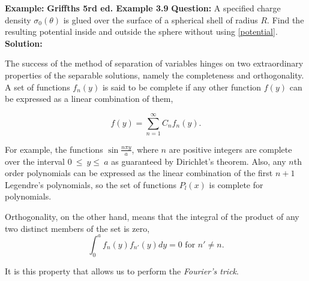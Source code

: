 \documentclass[a4paper,12pt]{report}
\begin{document}
	\begin{example_template}
		\textbf{Example:} \textbf{Griffths 5rd ed. Example 3.9} \newline \newline
		\textbf{Question:} A specified charge density \(\sigma_0(\theta)\) is glued over the surface of a spherical shell of radius \(R\). Find the resulting potential inside and outside the sphere without using \cref{potential}.  \newline \newline
		\textbf{Solution:}  
	\end{example_template}
	
	The success of the method of separation of variables hinges on two extraordinary properties of the separable solutions, namely the completeness and orthogonality. A set of functions \(f_{n} (y)\) is said to be complete if any other function \(f(y)\) can be expressed as a linear combination of them, \ie 
	
	\begin{equation}
		f(y) = \sum_{n=1}^{\infty} C_{n} f_{n} (y). 
	\end{equation}
	
	For example, the functions \(\sin \frac{n\pi y}{a}\), where \(n\) are positive integers are complete over the interval \(0~\le~y\le~a\) as guaranteed by Dirichlet's theorem. Also, any \(n\)th order polynomials can be expressed as the linear combination of the first \(n+1\) Legendre's polynomials, so the set of functions \(P_{l} (x)\) is complete for polynomials.
	
	Orthogonality, on the other hand, means that the integral of the product of any two distinct members of the set is zero, \ie 
	\begin{equation}
		\int_{0}^{a} f_{n} (y) f_{n'} (y) dy = 0 \text { for }  n' \neq n. 
	\end{equation}
	
	It is this property that allows us to perform the \emph{Fourier's trick}.

	
	
	
	
	
	
	
	
	
	
\end{document}
